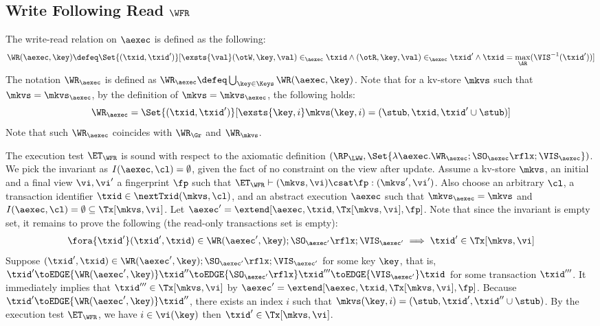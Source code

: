 \subsection{Write Following Read \( \WFR \) }
\label{sec:sound-complete-wfr}

The write-read relation  on \( \aexec \) is defined as the following:
\[
    \WR(\aexec, \key) \defeq \Set{ (\txid, \txid') }[ \exsts{\val} (\otW, \key, \val) \in_\aexec \txid \land (\otR, \key, \val) \in_\aexec \txid' \land \txid = \max_\AR(\VIS^{-1}(\txid')) ]
\]
The notation \( \WR_\aexec \) is defined as \( \WR_\aexec \defeq \bigcup_{\key \in \Keys} \WR(\aexec, \key) \).
Note that for a kv-store \( \mkvs \) such that \( \mkvs = \mkvs_\aexec \),
by the definition of  \(  \mkvs = \mkvs_\aexec \), 
the following holds:
\[
    \WR_\aexec = \Set{(\txid, \txid')}[\exsts{\key, i } \mkvs(\key, i) = (\stub, \txid, \txid'\cup \stub)]
\]
Note that such \( \WR_\aexec \) coincides with \( \WR_\Gr \) and \( \WR_\mkvs \).

The execution test $\ET_\WFR$ is sound with respect to the axiomatic definition 
\( (\RP_{\LWW}, \Set{\lambda \aexec. \WR_\aexec ; \SO_{\aexec}\rflx ; \VIS_{\aexec} })\).
We pick the invariant as \( I( \aexec, \cl ) = \emptyset \), given the fact of no constraint on the view after update.
Assume a kv-store $\mkvs$, an initial and a final view $\vi, \vi'$  a fingerprint $\fp$ 
such that $\ET_{\WFR} \vdash (\mkvs, \vi) \csat \fp: (\mkvs', \vi')$. 
Also choose an arbitrary $\cl$, a transaction identifier $\txid \in \nextTxid(\mkvs, \cl)$, 
and an abstract execution $\aexec$ such that $\mkvs_{\aexec} = \mkvs$ and 
\( I(\aexec, \cl) =  \emptyset \subseteq \Tx[\mkvs, \vi] \).
Let \( \aexec' = \extend[\aexec, \txid, \Tx[\mkvs, \vi], \fp] \).
Note that since the invariant is empty set, it remains to prove the following (the read-only transactions set is empty):
\[
    \begin{array}{@{}l@{}}
        \fora{ \txid' } 
        (\txid' ,\txid)  \in \WR(\aexec',\key) ; \SO_{\aexec'}\rflx ; \VIS_{\aexec'} 
        \implies \txid' \in \Tx[\mkvs, \vi]
    \end{array}
\]
Suppose \( (\txid' ,\txid)  \in \WR(\aexec', \key) ; \SO_{\aexec'}\rflx ; \VIS_{\aexec'} \) for some key \( \key \),
that is, \( \txid' \toEDGE{\WR(\aexec', \key)} \txid'' \toEDGE{\SO_{\aexec'}\rflx} \txid''' \toEDGE{\VIS_{\aexec'}} \txid \) for some transaction \( \txid''' \).
It immediately implies that \( \txid''' \in \Tx[\mkvs, \vi]  \) by \( \aexec' = \extend[\aexec, \txid, \Tx[\mkvs, \vi] , \fp] \).
Because \( \txid' \toEDGE{\WR(\aexec', \key)} \txid'' \), there exists an index \( i \) such that \( \mkvs(\key, i) = (\stub, \txid', \txid'' \cup \stub) \).
By the execution test \( \ET_\WFR \), we have \( i \in \vi( \key ) \) then \( \txid' \in \Tx[\mkvs, \vi] \).


